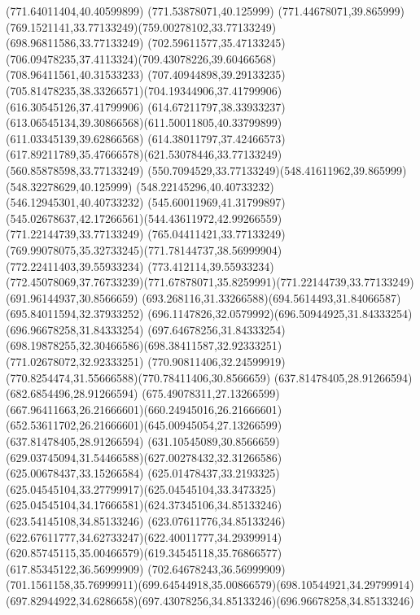 {{		\lineto(771.64011404,40.40599899)
		\lineto(771.53878071,40.125999)
		\curveto(771.44678071,39.865999)(769.1521141,33.77133249)(759.00278102,33.77133249)
		\lineto(698.96811586,33.77133249)
		\curveto(702.59611577,35.47133245)(706.09478235,37.4113324)(709.43078226,39.60466568)
		\lineto(708.96411561,40.31533233)
		\curveto(707.40944898,39.29133235)(705.81478235,38.33266571)(704.19344906,37.41799906)
		\lineto(616.30545126,37.41799906)
		\curveto(614.67211797,38.33933237)(613.06545134,39.30866568)(611.50011805,40.33799899)
		\lineto(611.03345139,39.62866568)
		\curveto(614.38011797,37.42466573)(617.89211789,35.47666578)(621.53078446,33.77133249)
		\lineto(560.85878598,33.77133249)
		\curveto(550.7094529,33.77133249)(548.41611962,39.865999)(548.32278629,40.125999)
		\lineto(548.22145296,40.40733232)
		\lineto(546.12945301,40.40733232)
		\curveto(545.60011969,41.31799897)(545.02678637,42.17266561)(544.43611972,42.99266559)
		\closepath
		\moveto(771.22144739,33.77133249)
		\lineto(765.04411421,33.77133249)
		\curveto(769.99078075,35.32733245)(771.78144737,38.56999904)(772.22411403,39.55933234)
		\lineto(773.412114,39.55933234)
		\curveto(772.45078069,37.76733239)(771.67878071,35.8259991)(771.22144739,33.77133249)
		\moveto(691.96144937,30.8566659)
		\curveto(693.268116,31.33266588)(694.5614493,31.84066587)(695.84011594,32.37933252)
		\curveto(696.1147826,32.0579992)(696.50944925,31.84333254)(696.96678258,31.84333254)
		\curveto(697.64678256,31.84333254)(698.19878255,32.30466586)(698.38411587,32.92333251)
		\lineto(771.02678072,32.92333251)
		\curveto(770.90811406,32.24599919)(770.8254474,31.55666588)(770.78411406,30.8566659)
		\closepath
		\moveto(637.81478405,28.91266594)
		\lineto(682.6854496,28.91266594)
		\curveto(675.49078311,27.13266599)(667.96411663,26.21666601)(660.24945016,26.21666601)
		\curveto(652.53611702,26.21666601)(645.00945054,27.13266599)(637.81478405,28.91266594)
		\moveto(631.10545089,30.8566659)
		\curveto(629.03745094,31.54466588)(627.00278432,32.31266586)(625.00678437,33.15266584)
		\curveto(625.01478437,33.2193325)(625.04545104,33.27799917)(625.04545104,33.3473325)
		\curveto(625.04545104,34.17666581)(624.37345106,34.85133246)(623.54145108,34.85133246)
		\curveto(623.07611776,34.85133246)(622.67611777,34.62733247)(622.40011777,34.29399914)
		\curveto(620.85745115,35.00466579)(619.34545118,35.76866577)(617.85345122,36.56999909)
		\lineto(702.64678243,36.56999909)
		\curveto(701.1561158,35.76999911)(699.64544918,35.00866579)(698.10544921,34.29799914)
		\curveto(697.82944922,34.6286658)(697.43078256,34.85133246)(696.96678258,34.85133246)
}}
